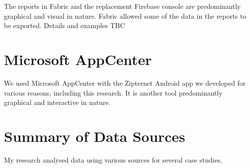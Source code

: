 The reports in Fabric and the replacement Firebase console are predominantly graphical and visual in nature. Fabric allowed some of the data in the reports to be exported. Details and examples TBC %

\section{Microsoft AppCenter}
We used Microsoft AppCenter with the Zipternet Android app we developed for various reasons, including this research. It is another tool predominantly graphical and interactive in nature.

\section{Summary of Data Sources}
My research analysed data using various sources for several case studies. 